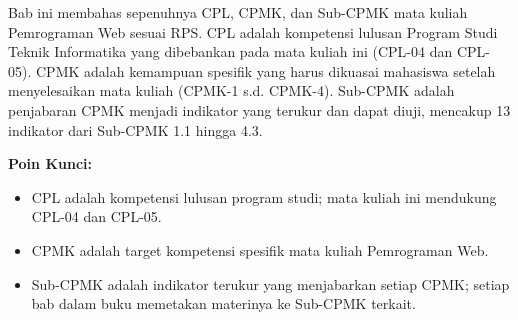 \documentclass[../main.tex]{subfiles}
\begin{document}
\begin{rangkuman}
Bab ini membahas sepenuhnya CPL, CPMK, dan Sub-CPMK mata kuliah Pemrograman Web sesuai RPS. CPL adalah kompetensi lulusan Program Studi Teknik Informatika yang dibebankan pada mata kuliah ini (CPL-04 dan CPL-05). CPMK adalah kemampuan spesifik yang harus dikuasai mahasiswa setelah menyelesaikan mata kuliah (CPMK-1 s.d. CPMK-4). Sub-CPMK adalah penjabaran CPMK menjadi indikator yang terukur dan dapat diuji, mencakup 13 indikator dari Sub-CPMK 1.1 hingga 4.3.

\textbf{Poin Kunci:}
\begin{itemize}
  \item CPL adalah kompetensi lulusan program studi; mata kuliah ini mendukung CPL-04 dan CPL-05.
  \item CPMK adalah target kompetensi spesifik mata kuliah Pemrograman Web.
  \item Sub-CPMK adalah indikator terukur yang menjabarkan setiap CPMK; setiap bab dalam buku memetakan materinya ke Sub-CPMK terkait.
\end{itemize}
\end{rangkuman}

\ifSubfilesClassLoaded{
  \renewcommand{\bibname}{Daftar Pustaka}
  
  
}{}
\end{document}
